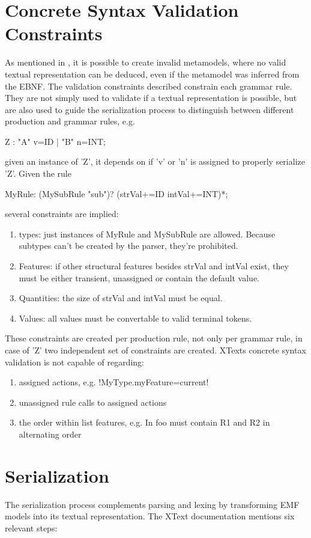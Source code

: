 \section{Concrete Syntax Validation Constraints}
As mentioned in \cite{MofCfg}, it is possible to create invalid metamodels, where no valid textual representation can be deduced, even if the metamodel was inferred from the EBNF. The validation constraints described constrain each grammar rule. They are not simply used to validate if a textual representation is possible, but are also used to guide the serialization process to distinguish between different production and grammar rules, e.g.
\begin{xtxt}
Z 	:  "A" v=ID  
	|  "B" n=INT;
\end{xtxt}
given an instance of 'Z', it depends on if 'v' or 'n' is assigned to properly serialize 'Z'.
Given the rule
\begin{xtxt}
MyRule:	({MySubRule} "sub")? (strVal+=ID intVal+=INT)*;
\end{xtxt}
several constraints are implied:
\begin{enumerate}
	\item types: just instances of MyRule and MySubRule are allowed. Because subtypes can't be created by the parser, they're prohibited. 
	\item Features: if other structural features besides strVal and intVal exist, they must be either transient, unassigned or contain the default value.
	\item Quantities: the size of strVal and intVal must be equal.
	\item Values: all values must be convertable to valid terminal tokens.
\end{enumerate}
These constraints are created per production rule, not only per grammar rule, in case of 'Z' two independent set of constraints are created.
XTexts concrete syntax validation is not capable of regarding:
\begin{enumerate}
	\item assigned actions, e.g. 
	\kode!{MyType.myFeature=current}!
	\item unassigned rule calls to assigned actions
	\item the order within list features, e.g. In  foo must contain R1 and R2 in alternating order
\end{enumerate}

\section{Serialization}
The serialization process complements parsing and lexing by transforming EMF models into its textual representation. The XText documentation mentions six relevant steps:

